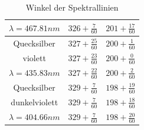 \documentclass[12pt,a4paper]{article}
\begin{document}
\begin{table}
\begin{tabular}{|c|c|c|}
		$\lambda=467.81nm$&$326+\frac{7}{60}$&$201+\frac{17}{60}$\\[0.1cm]
		\hline
		Quecksilber&$327+\frac{25}{60}$&$200+\frac{1}{60}$\\[0.1cm]
		violett&$327+\frac{23}{60}$&$200+\frac{0}{60}$\\[0.1cm]
		$\lambda=435.83nm$&$327+\frac{22}{60}$&$200+\frac{2}{60}$\\[0.1cm]
		\hline
		Quecksilber&$329+\frac{7}{60}$&$198+\frac{19}{60}$\\[0.1cm]
		dunkelviolett&$329+\frac{7}{60}$&$198+\frac{18}{60}$\\[0.1cm]
		$\lambda=404.66nm$&$329+\frac{7}{60}$&$198+\frac{20}{60}$\\[0.1cm]
		\hline
	\end{tabular}
	\caption{Winkel der Spektrallinien}
	\label{table:Winkel_Rohdaten}
\end{table}
\end{document}
